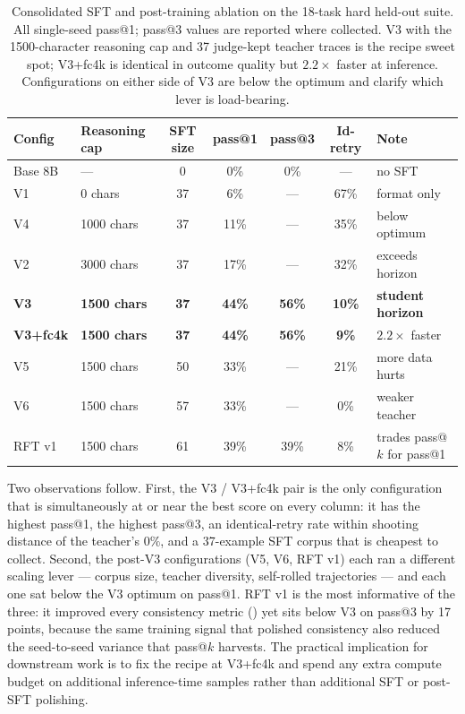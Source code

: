 \documentclass[11pt]{article}
\begin{document}
\begin{table}[ht]
\centering
\caption{Consolidated SFT and post-training ablation on the 18-task hard held-out suite. All single-seed pass@1; pass@3 values are reported where collected. V3 with the 1500-character reasoning cap and 37 judge-kept teacher traces is the recipe sweet spot; V3+fc4k is identical in outcome quality but $2.2\times$ faster at inference. Configurations on either side of V3 are below the optimum and clarify which lever is load-bearing.}
\label{tab:distill-ablation}
\footnotesize
\begin{tabular}{llccccl}
\toprule
Config & Reasoning cap & SFT size & pass@1 & pass@3 & Id-retry & Note \\
\midrule
Base 8B          & ---           & 0  & 0\%           & 0\%           & ---  & no SFT \\
V1               & 0 chars       & 37 & 6\%           & ---           & 67\% & format only \\
V4               & 1000 chars    & 37 & 11\%          & ---           & 35\% & below optimum \\
V2               & 3000 chars    & 37 & 17\%          & ---           & 32\% & exceeds horizon \\
\textbf{V3}      & \textbf{1500 chars} & \textbf{37} & \textbf{44\%} & \textbf{56\%} & \textbf{10\%} & \textbf{student horizon} \\
\textbf{V3+fc4k} & \textbf{1500 chars} & \textbf{37} & \textbf{44\%} & \textbf{56\%} & \textbf{9\%}  & $2.2\times$ faster \\
V5               & 1500 chars    & 50 & 33\%          & ---           & 21\% & more data hurts \\
V6               & 1500 chars    & 57 & 33\%          & ---           & 0\%  & weaker teacher \\
RFT v1           & 1500 chars    & 61 & 39\%          & 39\%          & 8\%  & trades pass@$k$ for pass@1 \\
\bottomrule
\end{tabular}
\end{table}

Two observations follow. First, the V3 / V3+fc4k pair is the only configuration that is simultaneously at or near the best score on every column: it has the highest pass@1, the highest pass@3, an identical-retry rate within shooting distance of the teacher's $0\%$, and a 37-example SFT corpus that is cheapest to collect. Second, the post-V3 configurations (V5, V6, RFT v1) each ran a different scaling lever --- corpus size, teacher diversity, self-rolled trajectories --- and each one sat below the V3 optimum on pass@1. RFT v1 is the most informative of the three: it improved every consistency metric () yet sits below V3 on pass@3 by 17 points, because the same training signal that polished consistency also reduced the seed-to-seed variance that pass@$k$ harvests. The practical implication for downstream work is to fix the recipe at V3+fc4k and spend any extra compute budget on additional inference-time samples rather than additional SFT or post-SFT polishing.
\end{document}
